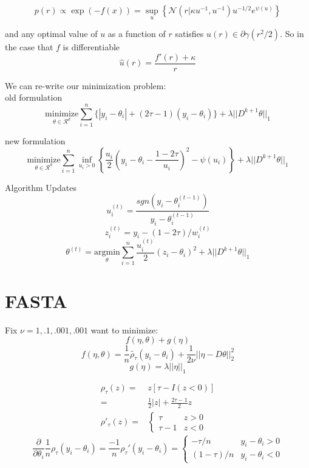\documentclass[]{article}
\begin{document}
$$p(r) \propto \exp(-f(x)) = \sup_u\left\{\mathcal{N}(r|\kappa u^{-1}, u^{-1})u^{-1/2}e^{\psi(u)}\right\}$$

and any optimal value of $u$ as a function of $r$ satisfies $\widehat{u}(r) \in \partial\gamma(r^2/2)$. So in the case that $f$ is differentiable
$$\widehat{u}(r) = \frac{f'(r)+\kappa}{r}$$
 
We can re-write our minimization problem:\\

old formulation
$$\underset{\theta \in \mathcal{R}^d}{\text{minimize}}\sum_{i=1}^n\{|y_i - \theta_i| + (2\tau-1)(y_i-\theta_i)\} + \lambda||D^{k+1}\theta||_1$$

new formulation
$$\underset{\theta \in \mathcal{R}^d}{\text{minimize}}\sum_{i=1}^n \inf_{u_i>0}\left\{\frac{u_i}{2}\left(y_i - \theta_i - \frac{1-2\tau}{u_i}\right)^2 - \psi(u_i)\right\} + \lambda||D^{k+1}\theta||_1$$

Algorithm Updates
$$u_i^{(t)} = \frac{sgn(y_i - \theta_i^{(t-1)})}{y_i - \theta_i^{(t-1)}}$$
$$z_i^{(t)} = y_i - (1-2\tau)/w_i^{(t)}$$
$$\theta^{(t)} = \underset{\theta}{\text{argmin}} \sum_{i=1}^n \frac{u_i^{(t)}}{2}(z_i - \theta_i)^2 + \lambda||D^{k+1}\theta||_1$$


\section{FASTA}

Fix $\nu = 1, .1, .001, .001$ want to minimize:
$$f(\eta,\theta) + g(\eta)$$
$$f(\eta, \theta) = \frac{1}{n}\tilde{\rho_{\tau}}(y_i - \theta_i) + \frac{1}{2\nu}||\eta-D\theta||_2^2$$
$$g(\eta) = \lambda||\eta||_1$$

\begin{align*}
\rho_{\tau}(z) =& z[\tau - I(z < 0)] \\
=& \frac{1}{2}|z| + \frac{2\tau-1}{2} z \\
\rho'_{\tau}(z) =& \begin{cases}
\tau & z > 0 \\
\tau - 1 & z < 0
\end{cases}
\end{align*}
$$\frac{\partial}{\partial\theta_i}\frac{1}{n}\rho_{\tau}(y_i-\theta_i) = \frac{-1}{n}\rho_{\tau}'(y_i-\theta_i) = \begin{cases}
-\tau/n & y_i - \theta_i > 0 \\
(1-\tau)/n  & y_i - \theta_i < 0
\end{cases}$$
\end{document}
